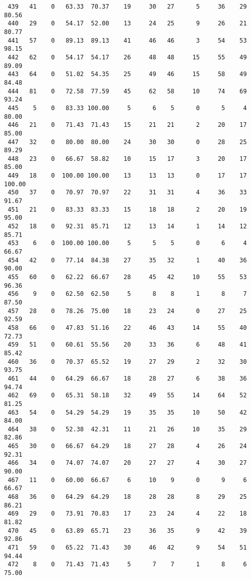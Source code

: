 \begin{verbatim}
 439   41    0   63.33  70.37    19     30   27      5     36    29    80.56
 440   29    0   54.17  52.00    13     24   25      9     26    21    80.77
 441   57    0   89.13  89.13    41     46   46      3     54    53    98.15
 442   62    0   54.17  54.17    26     48   48     15     55    49    89.09
 443   64    0   51.02  54.35    25     49   46     15     58    49    84.48
 444   81    0   72.58  77.59    45     62   58     10     74    69    93.24
 445    5    0   83.33 100.00     5      6    5      0      5     4    80.00
 446   21    0   71.43  71.43    15     21   21      2     20    17    85.00
 447   32    0   80.00  80.00    24     30   30      0     28    25    89.29
 448   23    0   66.67  58.82    10     15   17      3     20    17    85.00
 449   18    0  100.00 100.00    13     13   13      0     17    17   100.00
 450   37    0   70.97  70.97    22     31   31      4     36    33    91.67
 451   21    0   83.33  83.33    15     18   18      2     20    19    95.00
 452   18    0   92.31  85.71    12     13   14      1     14    12    85.71
 453    6    0  100.00 100.00     5      5    5      0      6     4    66.67
 454   42    0   77.14  84.38    27     35   32      1     40    36    90.00
 455   60    0   62.22  66.67    28     45   42     10     55    53    96.36
 456    9    0   62.50  62.50     5      8    8      1      8     7    87.50
 457   28    0   78.26  75.00    18     23   24      0     27    25    92.59
 458   66    0   47.83  51.16    22     46   43     14     55    40    72.73
 459   51    0   60.61  55.56    20     33   36      6     48    41    85.42
 460   36    0   70.37  65.52    19     27   29      2     32    30    93.75
 461   44    0   64.29  66.67    18     28   27      6     38    36    94.74
 462   69    0   65.31  58.18    32     49   55     14     64    52    81.25
 463   54    0   54.29  54.29    19     35   35     10     50    42    84.00
 464   38    0   52.38  42.31    11     21   26     10     35    29    82.86
 465   30    0   66.67  64.29    18     27   28      4     26    24    92.31
 466   34    0   74.07  74.07    20     27   27      4     30    27    90.00
 467   11    0   60.00  66.67     6     10    9      0      9     6    66.67
 468   36    0   64.29  64.29    18     28   28      8     29    25    86.21
 469   29    0   73.91  70.83    17     23   24      4     22    18    81.82
 470   45    0   63.89  65.71    23     36   35      9     42    39    92.86
 471   59    0   65.22  71.43    30     46   42      9     54    51    94.44
 472    8    0   71.43  71.43     5      7    7      1      8     6    75.00

\end{verbatim}

